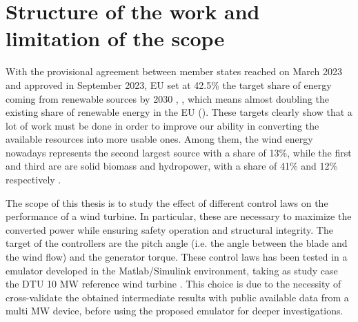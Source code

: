 \newpage
\section{Structure of the work and limitation of the scope}\label{sec:b_introduction}
With the provisional agreement between member states reached on March 2023 and approved in September 2023, EU set at 42.5\% the target share of energy coming from renewable sources by 2030 \cite{rauters}, \cite{EU_targets}, which means almost doubling the existing share of renewable energy in the EU (\cite{EU_targets}). These targets clearly show that a lot of work must be done in order to improve our ability in converting the available resources into more usable ones. Among them, the wind energy nowadays represents the second largest source with a share of 13\%, while the first and third are are solid biomass and hydropower, with a share of 41\% and 12\% respectively \cite{ren_share}. 

The scope of this thesis is to study the effect of different control laws on the performance of a wind turbine. In particular, these are necessary to maximize the converted power while ensuring safety operation and structural integrity. The target of the controllers are the pitch angle (i.e. the angle between the blade and the wind flow) and the generator torque. These control laws has been tested in a emulator developed in the Matlab/Simulink environment, taking as study case the DTU 10 MW reference wind turbine \cite{DTU_Wind_Energy_Report-I-0092}. This choice is due to the necessity of cross-validate the obtained intermediate results with public available data from a multi MW device, before using the proposed emulator for deeper investigations. 

